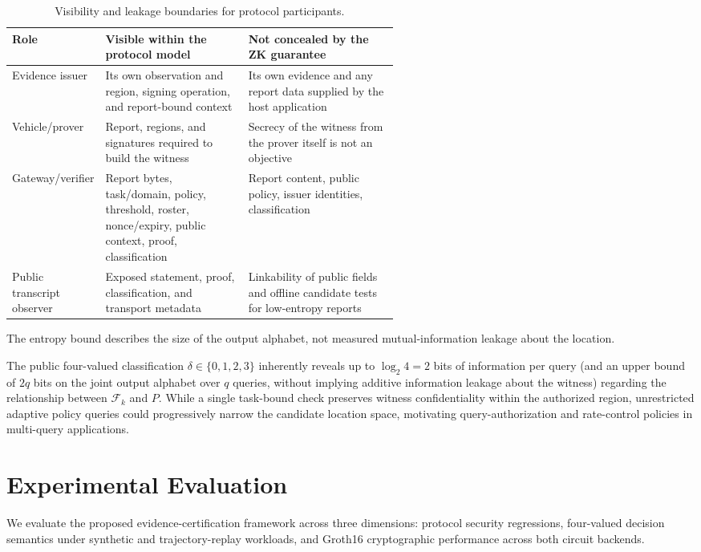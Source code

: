 \documentclass[pdflatex,iicol,sn-mathphys-num]{sn-jnl}
\theoremstyle{thmstyleone}
\begin{document}
\begin{table}[t]\centering\footnotesize
\caption{Visibility and leakage boundaries for protocol participants.}\label{tab:privacy-boundary}
\begin{tabularx}{\linewidth}{@{}p{0.19\linewidth}p{0.37\linewidth}X@{}}\toprule
Role & Visible within the protocol model & Not concealed by the ZK guarantee\\\midrule
Evidence issuer & Its own observation and region, signing operation, and report-bound context & Its own evidence and any report data supplied by the host application\\
Vehicle/prover & Report, regions, and signatures required to build the witness & Secrecy of the witness from the prover itself is not an objective\\
Gateway/verifier & Report bytes, task/domain, policy, threshold, roster, nonce/expiry, public context, proof, classification & Report content, public policy, issuer identities, classification\\
Public transcript observer & Exposed statement, proof, classification, and transport metadata & Linkability of public fields and offline candidate tests for low-entropy reports\\\bottomrule
\end{tabularx}\end{table}

The entropy bound describes the size of the output alphabet, not measured mutual-information leakage about the location.

The public four-valued classification $\delta \in \{0, 1, 2, 3\}$ inherently reveals up to $\log_2 4 = 2$ bits of information per query (and an upper bound of $2q$ bits on the joint output alphabet over $q$ queries, without implying additive information leakage about the witness) regarding the relationship between $\mathcal{F}_k$ and $P$. While a single task-bound check preserves witness confidentiality within the authorized region, unrestricted adaptive policy queries could progressively narrow the candidate location space, motivating query-authorization and rate-control policies in multi-query applications.
\section{Experimental Evaluation}
We evaluate the proposed evidence-certification framework across three dimensions: protocol security regressions, four-valued decision semantics under synthetic and trajectory-replay workloads, and Groth16 cryptographic performance across both circuit backends.
\end{document}
